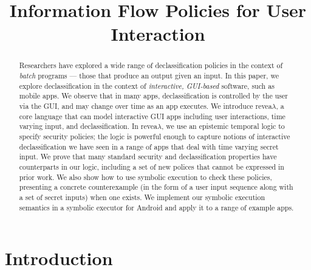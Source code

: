 \documentclass{sig-alternate}
\theoremstyle{definition}
\newcommand{\comment}[3][\color{red}]{{#1{[{#2}: {#3}]}}}
\newcommand{\kris}[1]{\comment[\color{orange}]{kris}{#1}}
\begin{document}
\title{Information Flow Policies for User Interaction}
\maketitle

\begin{abstract}
  Researchers have explored a wide range of declassification policies
  in the context of \emph{batch} programs --- those that produce an
  output given an input. In this paper, we explore declassification in
  the context of \emph{interactive, GUI-based} software, such as
  mobile apps. We observe that in many apps, declassification is
  controlled by the user via the GUI, and may change over time as an
  app executes. We introduce revea$\lambda$, a core language that can
  model interactive GUI apps including user interactions, time varying
  input, and declassification. In revea$\lambda$, we use an epistemic
  temporal logic to specify security policies; the logic is powerful
  enough to capture notions of interactive declassification we have
  seen in a range of apps that deal with time varying secret input. We
  prove that many standard security and declassification properties
  have counterparts in our logic, including a set of new polices that
  cannot be expressed in prior work.  We also show how to use symbolic
  execution to check these policies, presenting a concrete
  counterexample (in the form of a user input sequence along with a
  set of secret inputs) when one exists.  We implement our symbolic
  execution semantics in a symbolic executor for Android and apply it
  to a range of example apps.
\end{abstract}


\section{Introduction}
\label{sec:introduction}

\kris{This text is really bad.}
\end{document}
